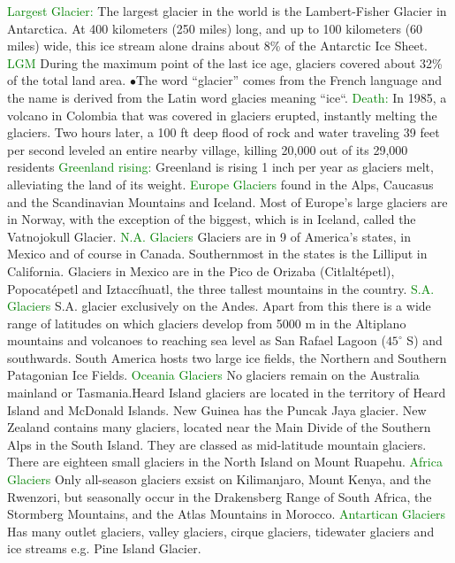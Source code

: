 \documentclass{article}
\newcommand{\ddd}{$\bullet$}
\newcommand{\green}[1]{\textcolor{green}{#1}}
\newcommand{\mysubsub}[1]{{{\green{#1}}}}
\begin{document}
\begin{multicols*}{4}
		    \mysubsub{Largest Glacier: } The largest glacier in the world is the Lambert-Fisher Glacier in Antarctica. At 400 kilometers (250 miles) long, and up to 100 kilometers (60 miles) wide, this ice stream alone drains about 8\% of the Antarctic Ice Sheet.
		    \mysubsub{LGM} During the maximum point of the last ice age, glaciers covered about 32\% of the total land area.
		    \ddd The word “glacier” comes from the French language and the name is derived from the Latin word glacies meaning “ice“.
		    \mysubsub{Death: } In 1985, a volcano in Colombia that was covered in glaciers erupted, instantly melting the glaciers. Two hours later, a 100 ft deep flood of rock and water traveling 39 feet per second leveled an entire nearby village, killing 20,000 out of its 29,000 residents
		    \mysubsub{Greenland rising: }  Greenland is rising 1 inch per year as glaciers melt, alleviating the land of its weight. 
		    \mysubsub{Europe Glaciers} found in the Alps, Caucasus and the Scandinavian Mountains and Iceland. Most of Europe's large glaciers are in Norway, with the exception of the biggest, which is in Iceland, called the Vatnojokull Glacier.
		    \mysubsub{N.A. Glaciers} Glaciers are in 9 of America's states, in Mexico and of course in Canada. Southernmost in the states is the Lilliput in California. Glaciers in Mexico are in the Pico de Orizaba (Citlaltépetl), Popocatépetl and Iztaccíhuatl, the three tallest mountains in the country.
		    \mysubsub{S.A. Glaciers} S.A. glacier exclusively on the Andes. Apart from this there is a wide range of latitudes on which glaciers develop from 5000 m in the Altiplano mountains and volcanoes to reaching sea level as San Rafael Lagoon ($ 45^\circ $ S) and southwards. South America hosts two large ice fields, the Northern and Southern Patagonian Ice Fields.
		    \mysubsub{Oceania Glaciers} No glaciers remain on the Australia mainland or Tasmania.Heard Island glaciers are located in the territory of Heard Island and McDonald Islands. New Guinea has the Puncak Jaya glacier. New Zealand contains many glaciers,  located near the Main Divide of the Southern Alps in the South Island. They are classed as mid-latitude mountain glaciers. There are eighteen small glaciers in the North Island on Mount Ruapehu.
		    \mysubsub{Africa Glaciers} Only all-season glaciers exsist on Kilimanjaro, Mount Kenya, and the Rwenzori, but seasonally occur in the Drakensberg Range of South Africa, the Stormberg Mountains, and the Atlas Mountains in Morocco.
		    \mysubsub{Antartican Glaciers} Has many outlet glaciers, valley glaciers, cirque glaciers, tidewater glaciers and ice streams e.g. Pine Island Glacier. 

\end{multicols*}
\end{document}
